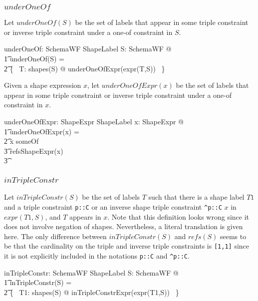\documentclass{article}
\begin{document}
\subsubsection{$underOneOf$}
Let $underOneOf(S)$ be the set of labels that appear in some triple constraint or inverse triple constraint under a one-of constraint
in $S$.
\begin{axdef}
	underOneOf: SchemaWF \fun \finset ShapeLabel
\where
	\forall S: SchemaWF @ \\
\t1		underOneOf(S) = \\
\t2		\bigcup \{~ T: shapes(S) @ underOneOfExpr(expr(T,S)) ~\}
\end{axdef}

Given a shape expression $x$, let $underOneOfExpr(x)$ be the set of labels that appear in some triple constraint or inverse triple constraint under a one-of constraint in $x$.
\begin{axdef}
	underOneOfExpr: ShapeExpr \fun \finset ShapeLabel
\where
	\forall x: ShapeExpr @ \\
\t1		underOneOfExpr(x) = \\
\t2			\IF x \in \ran someOf \\
\t3				\THEN refsShapeExpr(x) \\
\t3				\ELSE \emptyset
\end{axdef}

\subsubsection{$inTripleConstr$}
Let $inTripleConstr(S)$ be the set of labels $T$ such that there is a shape label $T1$ and a triple constraint 
{\tt p::C} or an inverse shape triple constraint
{\tt \verb+^+p::C} $x$ in $expr(T1, S)$, and $T$ appears in $x$.
Note that this definition looks wrong since it does not involve negation of shapes.
Nevertheless, a literal translation is given here.
The only difference between $inTripleConstr(S)$ and $refs(S)$ seems to be that the cardinality on the triple and inverse triple
constraints is {\tt [1,1]} since it is not explicitly included in the notations {\tt p::C} and {\tt \verb+^+p::C}.
\begin{axdef}
	inTripleConstr: SchemaWF \fun \finset ShapeLabel
\where
	\forall S: SchemaWF @ \\
\t1		inTripleConstr(S) = \\
\t2			\bigcup \{~ T1: shapes(S) @ inTripleConstrExpr(expr(T1,S)) ~\}
\end{axdef}
\end{document}

